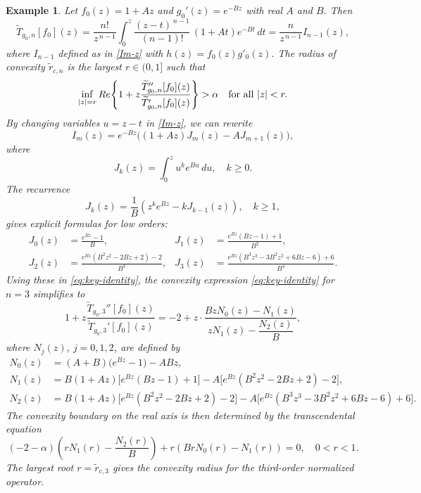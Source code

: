 \documentclass[12pt,a4paper]{amsart}
\numberwithin{equation}{section}
\newtheorem{example}{Example}[section]
\theoremstyle{remark}
\begin{document}
\begin{example}\label{ex:normalized-exp}\rm
Let \(f_0(z)=1+Az\) and \(g_0'(z)=e^{-Bz}\) with real \(A\) and \(B\). Then
\[
\widetilde{T}_{g_0,n}[f_0](z)
=\frac{n!}{z^{\,n-1}}\int_{0}^{z}\frac{(z-t)^{\,n-1}}{(n-1)!}\,(1+At)e^{-Bt}\,dt
=\frac{n}{z^{\,n-1}}I_{n-1}(z),
\]
where $I_{n-1}$ defined as in \eqref{Im-z} with $h(z)=f_0(z)g'_0(z)$.
The radius of convexity \(\tilde r_{c,n}\) is the largest \(r\in(0,1]\) such that
\[
\inf_{|z|=r}{\rm Re}\!\left\{1+z\frac{\widetilde{T}_{g_0,n}''[f_0](z)}{\widetilde{T}_{g_0,n}'[f_0](z)}\right\}>\alpha
\quad\text{for all }|z|<r.
\]
By changing variables \(u=z-t\) in \eqref{Im-z}, we can rewrite
\[
I_m(z)
= e^{-Bz}\bigl((1+Az)J_m(z)-A J_{m+1}(z)\bigr),
\]
where
\begin{equation*}
J_k(z)=\int_0^z u^k e^{Bu}\,du,\quad k\geq0.
\end{equation*}
The recurrence
\begin{equation*}
J_k(z)=\frac{1}{B}\left(z^k e^{Bz}-k J_{k-1}(z)\right),\quad k\geq 1,
\end{equation*}
gives explicit formulas for low orders:
\begin{align*}
J_0(z)&=\frac{e^{Bz}-1}{B},&
J_1(z)&=\frac{e^{Bz}(Bz-1)+1}{B^2},\\
J_2(z)&=\frac{e^{Bz}(B^2z^2-2Bz+2)-2}{B^3},&
J_3(z)&=\frac{e^{Bz}(B^3z^3-3B^2z^2+6Bz-6)+6}{B^4}.
\end{align*}
Using these in \eqref{eq:key-identity}, the convexity expression \eqref{eq:key-identity} for \(n=3\) simplifies to
\[
1+z\frac{\widetilde{T}_{g_0,3}''[f_0](z)}{\widetilde{T}_{g_0,3}'[f_0](z)}
= -2 + z\cdot \frac{B z N_0(z) - N_1(z)}{z N_1(z) - \dfrac{N_2(z)}{B}},
\]
where $N_j(z)$, $j=0,1,2$, are defined by  
\begin{align*}
N_0(z)
&=(A+B)\bigl(e^{Bz}-1\bigr)-A B z,\\[2pt]
N_1(z)
&=B(1+Az)\bigl[e^{Bz}(Bz-1)+1\bigr]
-A\bigl[e^{Bz}(B^2 z^2-2Bz+2)-2\bigr],\\[2pt]
N_2(z)
&=B(1+Az)\bigl[e^{Bz}(B^2 z^2-2Bz+2)-2\bigr]
-A\bigl[e^{Bz}(B^3 z^3-3B^2 z^2+6Bz-6)+6\bigr].
\end{align*}  
The convexity boundary on the real axis is then determined by the transcendental equation
\[
(-2-\alpha)\!\left(r N_1(r)-\frac{N_2(r)}{B}\right)
+ r\!\left(B r N_0(r)-N_1(r)\right)=0,\quad 0<r<1.
\]
The largest root \(r=\tilde r_{c,3}\) gives the convexity radius for the third-order normalized operator.


\end{example}
\end{document}
